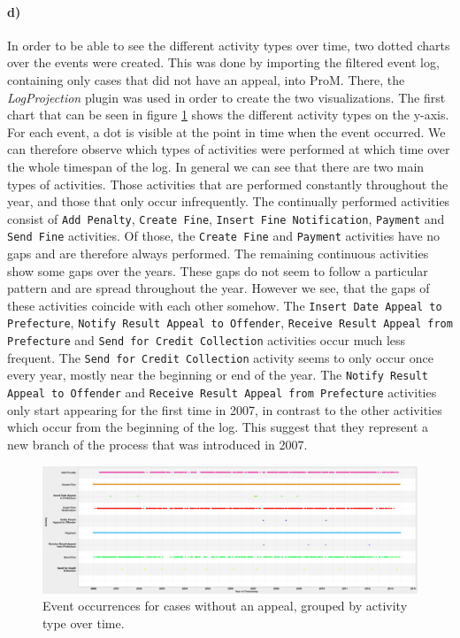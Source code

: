 \documentclass[12pt]{report}
\begin{document}
\paragraph{\textbf{d)}} In order to be able to see the different activity types over time, two dotted charts over the events were created. This was done by importing the filtered event log, containing only cases that did not have an appeal, into ProM. There, the \emph{LogProjection} plugin was used in order to create the two visualizations. The first chart that can be seen in figure \ref{fig:dotted_timestamp} shows the different activity types on the y-axis.
For each event, a dot is visible at the point in time when the event occurred. We can therefore observe which types of activities were performed at which time over the whole timespan of the log. In general we can see that there are two main types of activities. Those activities that are performed constantly throughout the year, and those that only occur infrequently. The continually performed activities consist of \texttt{Add Penalty}, \texttt{Create Fine}, \texttt{Insert Fine Notification}, \texttt{Payment} and \texttt{Send Fine} activities. Of those, the \texttt{Create Fine} and \texttt{Payment} activities have no gaps and are therefore always performed. The remaining continuous activities show some gaps over the years. These gaps do not seem to follow a particular pattern and are spread throughout the year. However we see, that the gaps of these activities coincide with each other somehow. The \texttt{Insert Date Appeal to Prefecture}, \texttt{Notify Result Appeal to Offender}, \texttt{Receive Result Appeal from Prefecture} and \texttt{Send for Credit Collection} activities occur much less frequent. The \texttt{Send for Credit Collection} activity seems to only occur once every year, mostly near the beginning or end of the year. The \texttt{Notify Result Appeal to Offender} and \texttt{Receive Result Appeal from Prefecture} activities only start appearing for the first time in 2007, in contrast to the other activities which occur from the beginning of the log. This suggest that they represent a new branch of the process that was introduced in 2007.
\begin{figure}[H]
  \centering
  \includegraphics[width=\textwidth]{figures/dotted_timestamp.png}
  \caption{Event occurrences for cases without an appeal, grouped by activity type over time.}
  \label{fig:dotted_timestamp}
\end{figure}
\end{document}
